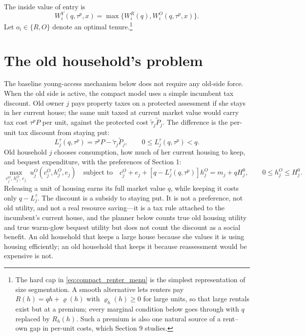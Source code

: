 \documentclass[11pt]{article}
\newcommand{\1}{\mathbf 1}
\begin{document}
The inside value of entry is
\begin{equation}
W_i^Y(q,\tau^p,x)
=
\max\{W_i^R(q),W_i^O(q,\tau^p,x)\}.
\label{eq:compact_tenure_value}
\end{equation}
Let $o_i\in\{R,O\}$ denote an optimal tenure.\footnote{The hard cap in \eqref{eq:compact_renter_menu} is the simplest representation of size segmentation. A smooth alternative lets renters pay $R(h)=q h+\varrho(h)$ with $\varrho_h(h)\ge0$ for large units, so that large rentals exist but at a premium; every marginal condition below goes through with $q$ replaced by $R_h(h)$. Such a premium is also one natural source of a rent--own gap in per-unit costs, which Section 9 studies.}

\section{The old household's problem}

The baseline young-access mechanism below does not require any old-side force. When the old side is active, the compact model uses a simple incumbent tax discount. Old owner $j$ pays property taxes on a protected assessment if she stays in her current house; the same unit taxed at current market value would carry tax cost $\tau^pP$ per unit, against the protected cost $\tilde\tau_j\tilde P_j$. The difference is the per-unit tax discount from staying put:
\[
L_j^\tau(q,\tau^p)
=
\tau^pP-\tilde\tau_j\tilde P_j,
\qquad
0\le L_j^\tau(q,\tau^p)<q.
\]
Old household $j$ chooses consumption, how much of her current housing to keep, and bequest expenditure, with the preferences of Section 1:
\begin{equation}
\max_{c_j^O,\,h_j^O,\,e_j}\;
u_j^O(c_j^O,h_j^O,e_j)
\quad\text{subject to}\quad
c_j^O+e_j+
\left[q-L_j^\tau(q,\tau^p)\right]h_j^O
=
m_j+q H_j^0,
\qquad
0\le h_j^O\le H_j^0.
\label{eq:compact_old_budget}
\end{equation}
Releasing a unit of housing earns its full market value $q$, while keeping it costs only $q-L_j^\tau$. The discount is a subsidy to staying put. It is not a preference, not old utility, and not a real resource saving---it is a tax rule attached to the incumbent's current house, and the planner below counts true old housing utility and true warm-glow bequest utility but does not count the discount as a social benefit. An old household that keeps a large house because she values it is using housing efficiently; an old household that keeps it because reassessment would be expensive is not.
\end{document}
